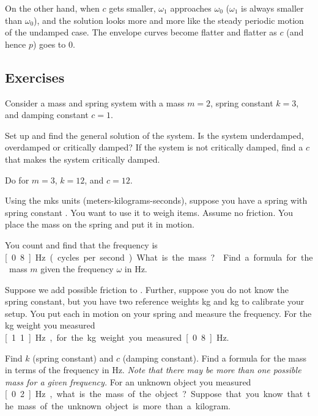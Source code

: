 On the other hand, when $c$ gets smaller, $\omega_1$ approaches $\omega_0$
($\omega_1$ is always smaller than $\omega_0$), and the solution looks more and more like the steady
periodic motion of the undamped case.  The envelope curves become flatter and
flatter as $c$ (and hence $p$) goes to $0$.

\subsection{Exercises}

\begin{samepage}
\begin{exercise} \label{mv:ex1}
Consider a mass and spring system with a mass $m=2$, spring constant $k=3$, and
damping constant $c=1$.
\begin{tasks}
\task Set up and find the general solution of the system.
\task Is the system underdamped, overdamped or critically damped?
\task If the system is not critically damped, find a $c$ that makes the system
critically damped.
\end{tasks}
\end{exercise}
\end{samepage}

\begin{exercise}
Do  for
$m=3$, $k=12$, and $c=12$.
\end{exercise}

\begin{exercise} \label{mv:exwt1}
Using the mks units (meters-kilograms-seconds),
suppose you have a spring with spring constant .
You want to use
it to weigh items.  Assume no friction.  You place the mass on
the spring and put it in motion.
\begin{tasks}
\task You count and find that the frequency is
\unit[0.8]{Hz} (cycles per second).  What is the mass?
\task Find a formula for the mass $m$
given the frequency $\omega$ in \unit{Hz}.
\end{tasks}
\end{exercise}

\begin{exercise}
Suppose we add possible friction to .
Further, suppose you do not know the spring constant, but you have
two reference weights \unit[1]{kg} and \unit[2]{kg} to calibrate your setup.
You put each in motion on your spring and measure the
frequency.  For the \unit[1]{kg}
weight you measured \unit[1.1]{Hz}, for the \unit[2]{kg} weight you
measured \unit[0.8]{Hz}.
\begin{tasks}
\task Find $k$ (spring constant) and $c$ (damping constant).
\task Find a formula for the mass in terms of the frequency in Hz.  \emph{Note that
there may be more than one possible mass for a given frequency.}
\task For an unknown object you measured \unit[0.2]{Hz}, what is the mass of the
object?  Suppose that you know that the mass of the unknown object
is more than a kilogram.
\end{tasks}
\end{exercise}

